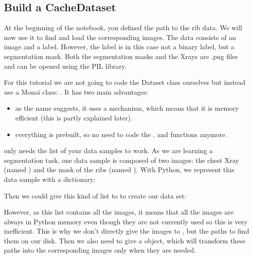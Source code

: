 \documentclass[letterpaper,10pt,english]{jupyterBook}
\begin{document}
\subsection{Build a CacheDataset}
\label{\detokenize{notebooks/Tutorial3_Segmentation/Tutorial3_Segmentation_student:build-a-cachedataset}}
\sphinxAtStartPar
At the beginning of the notebook, you defined the path to the rib data. We will now use it to find and load the corresponding images.
The data consists of an image and a label. However, the label is in this case not a binary label, but a segmentation mask. Both the segmentation masks and the X\sphinxhyphen{}rays are .png files and can be opened using the PIL library.

\sphinxAtStartPar
For this tutorial we are not going to code the Dataset class ourselves but instead use a Monai class: . It has two main advantages:
\begin{itemize}
\item {} 
\sphinxAtStartPar
as the name suggests, it uses a  mechanism, which means that it is memory efficient (this is partly explained later).

\item {} 
\sphinxAtStartPar
everything is pre\sphinxhyphen{}built, so no need to code the ,  and  functions anymore.

\end{itemize}

\sphinxAtStartPar
{} only needs the list of your data samples to work. As we are learning a segmentation task, one data sample is composed of two images: the chest X\sphinxhyphen{}ray (named ) and the mask of the ribs (named ). With Python, we represent this data sample with a dictionary:



\sphinxAtStartPar
Then we could give this kind of list to  to create our data set:



\sphinxAtStartPar
However, as this list contains all the images, it means that all the images are always in Python memory even though they are not currently used so this is very inefficient. This is why we don’t directly give  the images to , but the paths to find them on our disk. Then we also need to give a  object,  which will transform these paths into the corresponding images only when they are needed.
\end{document}
